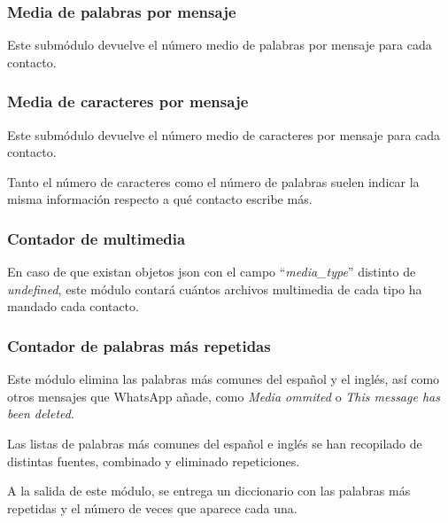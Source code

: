 \subsubsection{Media de palabras por mensaje}

Este submódulo devuelve el número medio de palabras por mensaje para cada contacto.

\subsubsection{Media de caracteres por mensaje}

Este submódulo devuelve el número medio de caracteres por mensaje para cada contacto.

Tanto el número de caracteres como el número de palabras suelen indicar la misma información respecto a qué contacto escribe más.

\subsubsection{Contador de multimedia}

En caso de que existan objetos \acrshort{json} con el campo ``\textit{media\_type}'' distinto de \textit{undefined}, este módulo contará cuántos archivos multimedia de cada tipo ha mandado cada contacto.

\subsubsection{Contador de palabras más repetidas}

Este módulo elimina las palabras más comunes del español y el inglés, así como otros mensajes que WhatsApp añade, como \textit{Media ommited} o \textit{This message has been deleted}.

Las listas de palabras más comunes del español e inglés se han recopilado de distintas fuentes, combinado y eliminado repeticiones.

A la salida de este módulo, se entrega un diccionario con las palabras más repetidas y el número de veces que aparece cada una.



